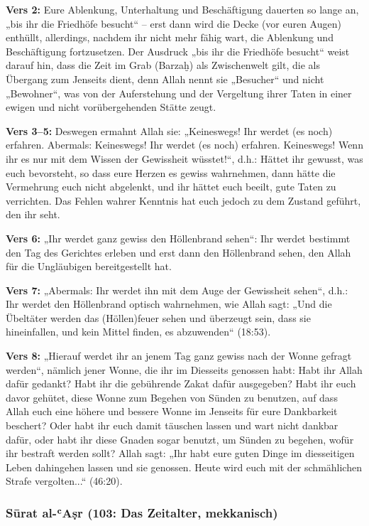 \textbf{Vers 2:} Eure Ablenkung, Unterhaltung und Beschäftigung dauerten so lange an, „bis ihr die
Friedhöfe besucht“ – erst dann wird die Decke (vor euren Augen) enthüllt, allerdings, nachdem
ihr nicht mehr fähig wart, die Ablenkung und Beschäftigung fortzusetzen. Der Ausdruck „bis ihr
die Friedhöfe besucht“ weist darauf hin, dass die Zeit im Grab (Barzaḫ) als Zwischenwelt gilt, die
als Übergang zum Jenseits dient, denn Allah nennt sie „Besucher“ und nicht „Bewohner“, was von
der Auferstehung und der Vergeltung ihrer Taten in einer ewigen und nicht vorübergehenden
Stätte zeugt.

\textbf{Vers 3–5:} Deswegen ermahnt Allah sie: „Keineswegs! Ihr werdet (es noch) erfahren.
Abermals: Keineswegs! Ihr werdet (es noch) erfahren. Keineswegs! Wenn ihr es nur mit dem
Wissen der Gewissheit wüsstet!“, d.h.: Hättet ihr gewusst, was euch bevorsteht, so dass eure
Herzen es gewiss wahrnehmen, dann hätte die Vermehrung euch nicht abgelenkt, und ihr hättet
euch beeilt, gute Taten zu verrichten. Das Fehlen wahrer Kenntnis hat euch jedoch zu dem
Zustand geführt, den ihr seht.

\textbf{Vers 6:} „Ihr werdet ganz gewiss den Höllenbrand sehen“: Ihr werdet bestimmt den Tag des
Gerichtes erleben und erst dann den Höllenbrand sehen, den Allah für die Ungläubigen
bereitgestellt hat.

\textbf{Vers 7:} „Abermals: Ihr werdet ihn mit dem Auge der Gewissheit sehen“, d.h.: Ihr werdet
den Höllenbrand optisch wahrnehmen, wie Allah  sagt: „Und die Übeltäter werden das
(Höllen)feuer sehen und überzeugt sein, dass sie hineinfallen, und kein Mittel finden, es
abzuwenden“ (18:53).

\textbf{Vers 8:} „Hierauf werdet ihr an jenem Tag ganz gewiss nach der Wonne gefragt werden“,
nämlich jener Wonne, die ihr im Diesseits genossen habt: Habt ihr Allah dafür gedankt? Habt ihr
die gebührende Zakat dafür ausgegeben? Habt ihr euch davor gehütet, diese Wonne zum
Begehen von Sünden zu benutzen, auf dass Allah euch eine höhere und bessere Wonne im
Jenseits für eure Dankbarkeit beschert? Oder habt ihr euch damit täuschen lassen und wart nicht
dankbar dafür, oder habt ihr diese Gnaden sogar benutzt, um Sünden zu begehen, wofür ihr
bestraft werden sollt? Allah  sagt: „Ihr habt eure guten Dinge im diesseitigen Leben
dahingehen lassen und sie genossen. Heute wird euch mit der schmählichen Strafe vergolten...“
(46:20).

\subsubsection*{Sūrat al-ʿAṣr (103: Das Zeitalter, mekkanisch)}

